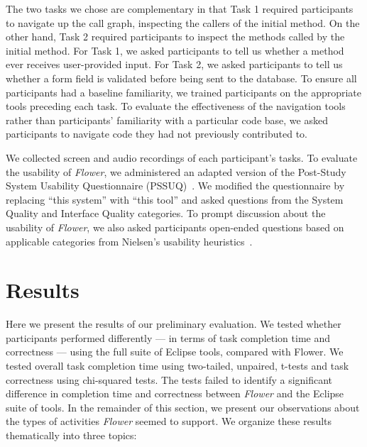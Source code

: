 \documentclass[conference]{IEEEtran}
\begin{document}
The two tasks we chose are complementary in that Task 1 required participants to navigate up the call graph, inspecting the callers of the initial method. 
On the other hand, Task 2 required participants to inspect the methods called by the initial method.
For Task 1, we asked participants to tell us whether a method ever receives user-provided input.
For Task 2, we asked participants to tell us whether a form field is validated before being sent to the database.
To ensure all participants had a baseline familiarity, we trained participants on the appropriate tools preceding each task. 
To evaluate the effectiveness of the navigation tools rather than participants' familiarity with a particular code base, we asked participants to navigate code they had not previously contributed to. 

We collected screen and audio recordings of each participant's tasks.
To evaluate the usability of \textit{Flower}, we administered an adapted version of the Post-Study System Usability Questionnaire (PSSUQ)~\cite{Lewis95ibmcomputer}. We modified the questionnaire by replacing ``this system'' with ``this tool'' and asked questions from the System Quality and Interface Quality categories.
To prompt discussion about the usability of \textit{Flower}, we also asked participants open-ended questions based on applicable categories from Nielsen's usability heuristics~\cite{Nielsen1992}.


\section{Results}
Here we present the results of our preliminary evaluation. 
We tested whether participants performed differently --- in terms of task completion time and correctness --- using the full suite of Eclipse tools, compared with Flower. 
We tested overall task completion time using two-tailed, unpaired, t-tests and task correctness using chi-squared tests. 
The tests failed to identify a significant difference in completion time and correctness between \textit{Flower} and the Eclipse suite of tools. 
In the remainder of this section, we present our observations about the types of activities \textit{Flower} seemed to support.
We organize these results thematically into three topics:
\end{document}
